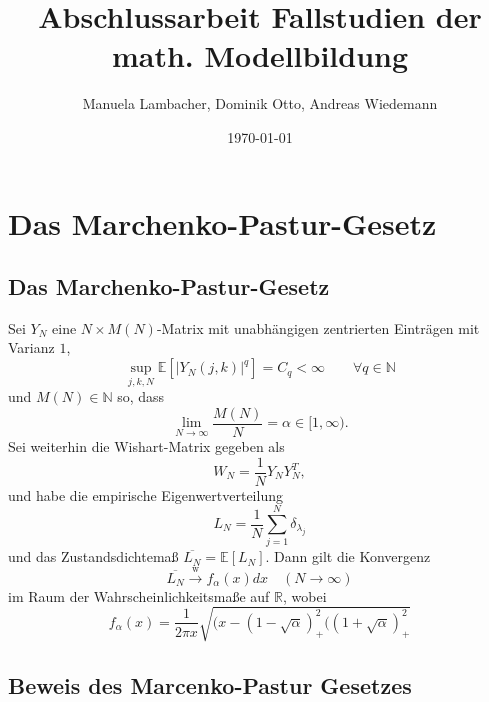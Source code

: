 \documentclass[a4paper, 11pt]{scrreprt}
\title{Abschlussarbeit Fallstudien der math. Modellbildung}
\author{Manuela Lambacher, Dominik Otto, Andreas Wiedemann}
\date{\today}
\newcommand{\RR}{\mathbb{R}}
\newcommand{\EE}{\mathbb{E}}
\newcommand{\NN}{\mathbb{N}}
\begin{document}
\parindent 0pt
\maketitle


\chapter{Das Marchenko-Pastur-Gesetz}

\section*{Das Marchenko-Pastur-Gesetz}

Sei \(Y_N\) eine \(N\times M(N)\)-Matrix mit unabhängigen zentrierten Einträgen mit Varianz \(1\),
	\[\sup_{j,k,N} \EE\left[ | Y_N(j,k)|^q\right] = C_q < \infty \qquad \forall q \in \NN\]
und \(M(N) \in \NN\) so, dass
	\[\lim_{N\to\infty} \frac{M(N)}{N} = \alpha \in[1,\infty). \]
Sei weiterhin die Wishart-Matrix gegeben als 
	\[W_N = \frac{1}{N}Y_NY_N^T,\]
und habe die empirische Eigenwertverteilung
	\[L_N = \frac{1}{N} \sum_{j=1}^{N} \delta_{\lambda_j} \]
und das Zustandsdichtemaß \(\overline{L_N} = \EE[L_N]\). Dann gilt die Konvergenz
	\[\overline{L_N} \xrightarrow{\text{w}} f_{\alpha}(x)dx \quad(N\to\infty)\]
im Raum der Wahrscheinlichkeitsmaße auf \(\RR\), wobei
	\[f_{\alpha}(x)=\frac{1}{2\pi x}\sqrt{(x-(1-\sqrt{\alpha})^2_{+}((1+\sqrt{\alpha})^2_{+}} \]

\newpage
\section*{Beweis des Marcenko-Pastur Gesetzes}
\end{document}
